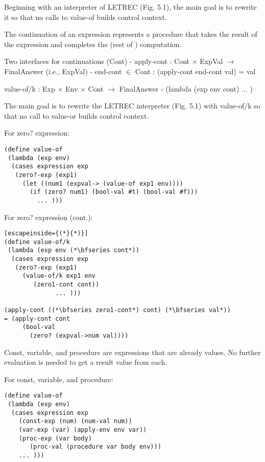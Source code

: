 \documentclass{article}
\begin{document}
\begin{huge}
Beginning with an interpreter of LETREC (Fig. 5.1), the main goal is to rewrite it so that no calls to value-of builds control context.

The continuation of an expression represents a procedure that takes the result of the expression
and completes the (rest of ) computation. 

Two interfaces for continuations (Cont) \al
- apply-cont : Cont $\times$ ExpVal $\rightarrow$ FinalAnswer (i.e., ExpVal) \al
- end-cont $\in$ Cont : (apply-cont end-cont val) = val


value-of/k : Exp $\times$ Env $\times$ Cont $\rightarrow$ FinalAnswer \al
- (lambda (exp env cont) ... )

The main goal is to rewrite the LETREC interpreter (Fig. 5.1) with value-of/k 
so that no call to value-or builds control context. \al

For zero? expression:
\begin{lstlisting}
(define value-of
 (lambda (exp env) 
  (cases expression exp 
   (zero?-exp (exp1) 
     (let ((num1 (expval-> (value-of exp1 env))))
       (if (zero? num1) (bool-val #t) (bool-val #f)))
         ... )))
\end{lstlisting}


For zero? expression (cont.): 
\begin{lstlisting}[escapeinside={(*}{*)}]
(define value-of/k
 (lambda (exp env (*\bfseries cont*)) 
  (cases expression exp 
   (zero?-exp (exp1) 
     (value-of/k exp1 env 
        (zero1-cont cont))
              ... )))
         
(apply-cont ((*\bfseries zero1-cont*) cont) (*\bfseries val*))
= (apply-cont cont
     (bool-val 
       (zero? (expval->num val))))
\end{lstlisting}


Const, variable, and procedure are expressions that are already values. No further evaluation is needed to get a result value from each. 

For const, variable, and procedure:
\begin{lstlisting}
(define value-of
 (lambda (exp env) 
  (cases expression exp 
    (const-exp (num) (num-val num))
    (var-exp (var) (apply-env env var))
    (proc-exp (var body) 
       (proc-val (procedure var body env)))
    ... )))
\end{lstlisting}


\end{huge}
\end{document}
